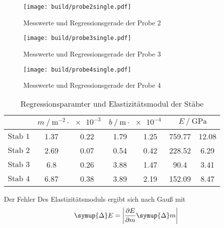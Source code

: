 \begin{figure}
  \centering
  \caption{Messwerte und Regressionsgerade der Probe 2}
  \label{fig:probe2single}
  \texttt{[image: build/probe2single.pdf]}
\end{figure}
\begin{figure}
  \centering
  \caption{Messwerte und Regressionsgerade der Probe 3}
  \label{fig:probe3single}
  \texttt{[image: build/probe3single.pdf]}
\end{figure}
\begin{figure}
  \centering
  \caption{Messwerte und Regressionsgerade der Probe 4}
  \label{fig:probe4single}
  \texttt{[image: build/probe4single.pdf]}
\end{figure}
\begin{table}
  \centering
  \caption{Regressionsparamter und Elastizitätsmodul der Stäbe}
  \label{tab:regression}
  \begin{tabular} {S[table-format=3.0] 
    S[table-format=1.2] @{${}\pm{}$} S[table-format=1.2]
    S[table-format=1.2] @{${}\pm{}$} S[table-format=1.2] 
    S[table-format=3.2] @{${}\pm{}$} S[table-format=2.2]}
  \toprule
  &  & 
     & 
    \\
  \midrule
  {$\text{Stab 1}$}  & 1.37 & 0.22 & 1.79 & 1.25 & 759.77 & 12.08\\
  {$\text{Stab 2}$}  & 2.69 & 0.07 & 0.54 & 0.42 & 228.52 & 6.29  \\
  {$\text{Stab 3}$}  & 6.8  & 0.26 & 3.88 & 1.47 & 90.4   & 3.41 \\ 
  {$\text{Stab 4}$}  & 6.87 & 0.38 & 3.89 & 2.19 & 152.09 & 8.47 \\
  \bottomrule
  \end{tabular}
\end{table}
Der Fehler Des Elastizitätsmoduls ergibt sich nach Gauß mit
\begin{equation*}
  \symup{\Delta} E = \left | \frac{\partial E}{\partial m}  \symup{\Delta} m \right | \label{eqn:gauss}
\end{equation*}
\FloatBarrier

